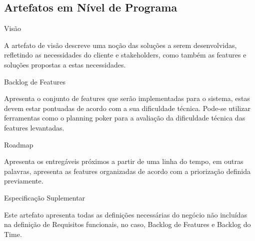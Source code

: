 {\large{\subsection {Artefatos em Nível de Programa \\}}}
\begin{itemize}

{
	\large{\item Visão \\}

	\tab A artefato de visão descreve uma noção das soluções a serem desenvolvidas, refletindo as necessidades do cliente e stakeholders, como também as features e soluções propostas a estas necessidades. \\
}


{
	\large{\item Backlog de Features \\}

	\tab Apresenta o conjunto de features que serão implementadas para o sistema, estas devem estar pontuadas de acordo com a sua dificuldade técnica. Pode-se utilizar ferramentas como o planning poker para a avaliação da dificuldade técnica das features levantadas. \\
}

{
	\large{\item Roadmap \\}

	\tab Apresenta os entregáveis próximos a partir de uma linha do tempo, em outras palavras, apresenta as features organizadas de acordo com a priorização definida previamente. \\
}

{
	\large{\item Especificação Suplementar\\}

	\tab Este artefato apresenta todas as definições necessárias do negócio não incluídas na definição de Requisitos funcionais, no caso, Backlog de Features e Backlog do Time. \\
}
\end{itemize}

